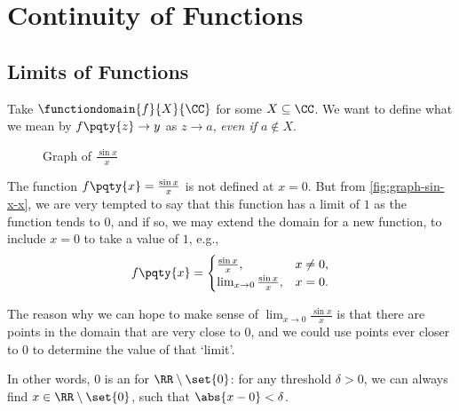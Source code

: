 \section{Continuity of Functions}
\subsection{Limits of Functions}

Take \(\functiondomain{f}{X}{\CC}\) for some \(X \subseteq \CC\). We want to define what we mean by \(f\pqty{z} \to y\) as \(z \to a\), \emph{even if \(a \notin X\)}.

\begin{figure}[ht!]
    \centering
    \caption{Graph of \(\frac{\sin x}{x}\)}
    \label{fig:graph-sin-x-x}
\end{figure}

\begin{example}
    The function \(f\pqty{x} = \frac{\sin x}{x}\) is not defined at \(x = 0\). But from \autoref{fig:graph-sin-x-x}, we are very tempted to say that this function has a limit of \(1\) as the function tends to \(0\), and if so, we may extend the domain for a new function, to include \(x = 0\) to take a value of \(1\), e.g.,
    \[
        f\pqty{x} = \begin{cases}
            \frac{\sin x}{x}, & x \neq 0, \\
            \lim_{x \to 0} \frac{\sin x}{x}, & x = 0.
        \end{cases}
    \]
\end{example}

The reason why we can hope to make sense of \(\lim_{x \to 0} \frac{\sin x}{x}\) is that there are points in the domain that are very close to \(0\), and we could use points ever closer to \(0\) to determine the value of that `limit'.

In other words, \(0\) is an  for \(\RR \setminus \set{0}\): for any threshold \(\delta > 0\), we can always find \(x \in \RR \setminus \set{0}\), such that \(\abs{x - 0} < \delta\).

